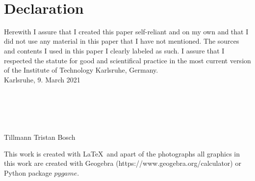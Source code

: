 \documentclass[12pt,a4paper]{scrartcl}
\newcommand{\1}{\mathbbm{1}}
\theoremstyle{definition}
\numberwithin{equation}{section}
\begin{document}
\newpage
\thispagestyle{empty}
\phantom \\
\newpage
  
\thispagestyle{empty}

\vspace{8cm}


\section{Declaration}

Herewith I assure that I created this paper self-reliant and on my own and that I did not use any material in this paper that I have not mentioned. The sources and contents I used in this paper I clearly labeled as such. I assure that I respected the statute for good and scientifical practice in the most current version of the Institute of Technology Karlsruhe, Germany.\\[2ex] 

\noindent
Karlsruhe, 9. March 2021\\[5ex] 
\\
\\
\\
\\
\\
Tillmann Tristan Bosch

\vspace*{\fill}

This work is created with \LaTeX\ and apart of the photographs all graphics in this work are created with Geogebra (https://www.geogebra.org/calculator) or Python package $\mathit{pygame}$. 
\end{document}
